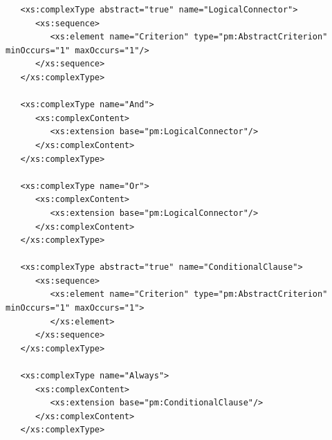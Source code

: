 \documentclass[a4paper,11pt] {ivoa}
\begin{document}
\begin{lstlisting}
   <xs:complexType abstract="true" name="LogicalConnector">
      <xs:sequence>
         <xs:element name="Criterion" type="pm:AbstractCriterion" minOccurs="1" maxOccurs="1"/>
      </xs:sequence>
   </xs:complexType>

   <xs:complexType name="And">
      <xs:complexContent>
         <xs:extension base="pm:LogicalConnector"/>
      </xs:complexContent>
   </xs:complexType>

   <xs:complexType name="Or">
      <xs:complexContent>
         <xs:extension base="pm:LogicalConnector"/>
      </xs:complexContent>
   </xs:complexType>

   <xs:complexType abstract="true" name="ConditionalClause">
      <xs:sequence>
         <xs:element name="Criterion" type="pm:AbstractCriterion" minOccurs="1" maxOccurs="1">
         </xs:element>
      </xs:sequence>
   </xs:complexType>

   <xs:complexType name="Always">
      <xs:complexContent>
         <xs:extension base="pm:ConditionalClause"/>
      </xs:complexContent>
   </xs:complexType>


\end{lstlisting}
\end{document}

